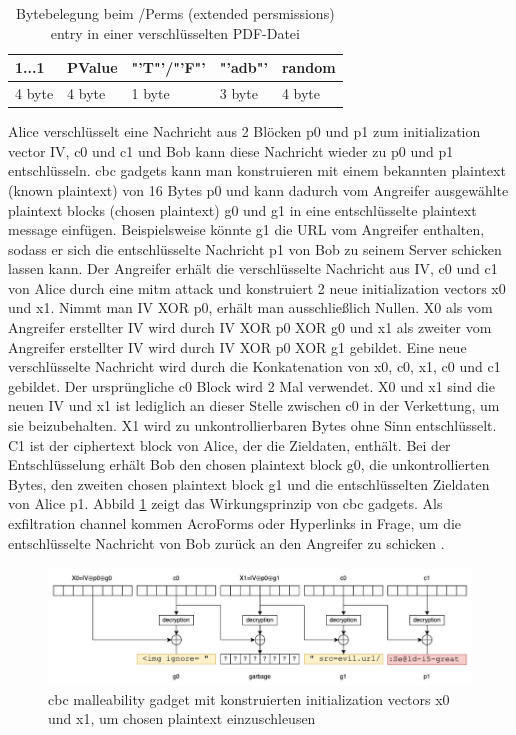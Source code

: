 \begin{table}[!htbp]
	\centering
	\begin{tabular}{|p{2cm}|p{2cm}|p{2cm}|p{2cm}|p{2cm}|}
	\hline
	\textbf{1...1}	& \textbf{PValue} 	& \textbf{"'T"'/"'F"'} 	& \textbf{"'adb"'} 	& \textbf{random} 	\\ 
	\hline
	4 byte 			& 4 byte 			& 1 byte  				& 3 byte 			& 4 byte 			\\ 
	\hline
	\end{tabular}
	\caption{Bytebelegung beim /Perms (extended persmissions) entry in einer verschlüsselten PDF-Datei \cite{ccc-break-pdf}}
	\label{table:perms}
\end{table}

Alice verschlüsselt eine Nachricht aus 2 Blöcken p0 und p1 zum initialization vector IV, c0 und c1 und Bob kann diese Nachricht wieder zu p0 und p1 entschlüsseln. \gls{cbc} gadgets kann man konstruieren mit einem bekannten plaintext (known plaintext) von 16 Bytes p0 und kann dadurch vom Angreifer ausgewählte plaintext blocks (chosen plaintext) g0 und g1 in eine entschlüsselte plaintext message einfügen. Beispielsweise könnte g1 die URL vom Angreifer enthalten, sodass er sich die entschlüsselte Nachricht p1 von Bob zu seinem Server schicken lassen kann. Der Angreifer erhält die verschlüsselte Nachricht aus IV, c0 und c1 von Alice durch eine \gls{mitm} attack und konstruiert 2 neue initialization vectors x0 und x1. Nimmt man IV XOR p0, erhält man ausschließlich Nullen. X0 als vom Angreifer erstellter IV wird durch IV XOR p0 XOR g0 und x1 als zweiter vom Angreifer erstellter IV wird durch IV XOR p0 XOR g1 gebildet. Eine neue verschlüsselte Nachricht wird durch die Konkatenation von x0, c0, x1, c0 und c1 gebildet. Der ursprüngliche c0 Block wird 2 Mal verwendet. X0 und x1 sind die neuen IV und x1 ist lediglich an dieser Stelle zwischen c0 in der Verkettung, um sie beizubehalten. X1 wird zu unkontrollierbaren Bytes ohne Sinn entschlüsselt. C1 ist der ciphertext block von Alice, der die Zieldaten, enthält. Bei der Entschlüsselung erhält Bob den chosen plaintext block g0, die unkontrollierten Bytes, den zweiten chosen plaintext block g1 und die entschlüsselten Zieldaten von Alice p1. Abbild \ref{fig:gadget} zeigt das Wirkungsprinzip von \gls{cbc} gadgets. Als exfiltration channel kommen AcroForms oder Hyperlinks in Frage, um die entschlüsselte Nachricht von Bob zurück an den Angreifer zu schicken \cite{gadget, ccc-break-pdf, crypto-web}.
\par

\begin{figure}[!htbp]
	\centering
	\includegraphics[width=1\textwidth]{"images/gadget2-gadget.png"}
	\caption{\gls{cbc} malleability gadget mit konstruierten initialization vectors x0 und x1, um chosen plaintext einzuschleusen \cite{gadget}}
	\label{fig:gadget}
\end{figure}

